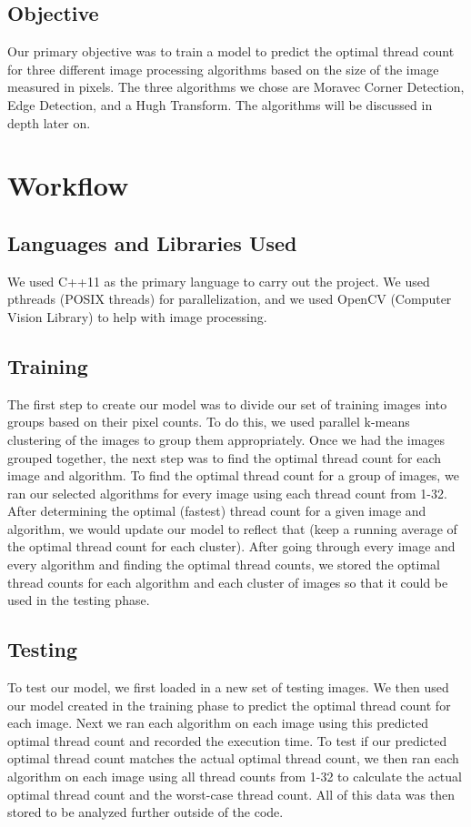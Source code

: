 \documentclass{article}
\begin{document}
    \subsection{Objective}
        Our primary objective was to train a model to predict the optimal thread count for three different image processing algorithms based on the size of the image measured in pixels. The three algorithms we chose are Moravec Corner Detection, Edge Detection, and a Hugh Transform. The algorithms will be discussed in depth later on.

\section{Workflow}
    \subsection{Languages and Libraries Used}
        We used C++11 as the primary language to carry out the project. We used pthreads (POSIX threads) for parallelization, and we used OpenCV (Computer Vision Library) to help with image processing.
        
    \subsection{Training}
        The first step to create our model was to divide our set of training images into groups based on their pixel counts. To do this, we used parallel k-means clustering of the images to group them appropriately. Once we had the images grouped together, the next step was to find the optimal thread count for each image and algorithm. To find the optimal thread count for a group of images, we ran our selected algorithms for every image using each thread count from 1-32. After determining the optimal (fastest) thread count for a given image and algorithm, we would update our model to reflect that (keep a running average of the optimal thread count for each cluster). After going through every image and every algorithm and finding the optimal thread counts, we stored the optimal thread counts for each algorithm and each cluster of images so that it could be used in the testing phase.
        
    \subsection{Testing}
        To test our model, we first loaded in a new set of testing images. We then used our model created in the training phase to predict the optimal thread count for each image. Next we ran each algorithm on each image using this predicted optimal thread count and recorded the execution time. To test if our predicted optimal thread count matches the actual optimal thread count, we then ran each algorithm on each image using all thread counts from 1-32 to calculate the actual optimal thread count and the worst-case thread count. 
        All of this data was then stored to be analyzed further outside of the code.
        
\end{document}
